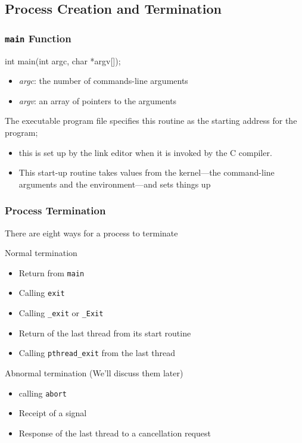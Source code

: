 \documentclass[newPxFont,sthlmFooter,nooffset]{beamer}
\begin{document}
\subsection{Process Creation and Termination }

\begin{frame}[containsverbatim,t]
  \frametitle{\texttt{main} Function}
\begin{codedef}
int main(int argc, char *argv[]);
\end{codedef}
\begin{itemize}
\item \textit{argc}: the number of commands-line arguments
\item \textit{argv}: an array of pointers to the arguments
\end{itemize}

The executable program file specifies this routine as the starting address for the program;
\begin{itemize}
\item this is set up by the link editor when it is invoked by the C
  compiler.
\item This start-up routine takes values from the kernel---the
  command-line arguments and the environment---and sets things up
\end{itemize}

\end{frame}



\begin{frame}[t]
  \frametitle{Process Termination}

There are eight ways for a process to terminate

Normal termination
\begin{itemize}
\item Return from \texttt{main}
\item Calling \texttt{exit}
\item Calling \texttt{\_exit} or \texttt{\_Exit}
\item Return of the last thread from its start routine
\item Calling \texttt{pthread\_exit} from the last thread
\end{itemize}

Abnormal termination (We'll discuss them later)
\begin{itemize}
\item calling \texttt{abort}
\item Receipt of a signal
\item Response of the last thread to a cancellation request
\end{itemize}

\end{frame}
\end{document}
